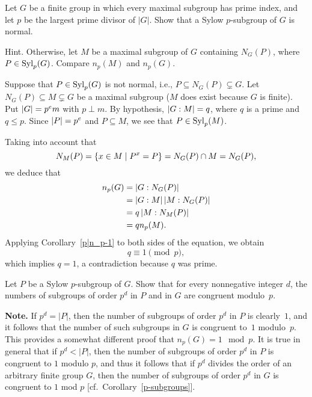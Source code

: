 \begin{probl}\label{problem-1.C.7}
    Let $G$ be a finite group in which every maximal subgroup has prime index, and let $p$ be the largest prime divisor of\/ $|G|$. Show that a Sylow $p$-subgroup of\/ $G$ is normal.

    \textrm{\rm Hint. Otherwise, let $M$ be a maximal subgroup of $G$ containing $N_G(P)$, where $P\in{\rm Syl}_p(G)$. Compare $n_{p}(M)$ and $n_p(G)$.}
\end{probl}

\begin{solution} Suppose that $P\in{\rm Syl}_p(G)$ is not normal, i.e., $P\subseteq N_G(P)\varsubsetneq G$. Let $N_G(P)\subseteq M\varsubsetneq G$ be a maximal subgroup ($M$ does exist because $G$ is finite). Put $\left\vert{G}\right\vert=p^em$ with $p\perp m$. By hypothesis, $\left\vert{G:M}\right\vert=q$, where $q$ is a prime and $q\le p$. Since $\left\vert{P}\right\vert=p^e$ and $P\subseteq M$, we see that $P\in{\rm Syl}_p(M)$. %


Taking into account that
$$
    N_M(P)=\{x\in M\mid P^x=P\} = N_G(P)\cap M= N_G(P),
$$
we deduce that %
\begin{align*}
    n_p(G) &= |G:N_G(P)|\\
        &= \left\vert{G:M}\right\vert|M:N_G(P)|\\
        &= q\left\vert{M:N_M(P)}\right\vert\\
        &= qn_p(M).
\end{align*}
Applying Corollary~\ref{p|n_p-1} to both sides of the equation, we obtain
$$
    q\equiv1\pmod p,
$$
which implies $q=1$, a contradiction because $q$ was prime.  \end{solution}

\begin{probl}\label{problem-1.C.8}
    Let\/ $P$ be a Sylow\/ $p$-subgroup of\/ $G$. Show that for every nonnegative integer\/ $d$, the numbers of subgroups of order\/ $p^d$ in\/ $P$ and in\/ $G$ are congruent modulo\/~$p$.

    \textrm{\rm {\bf Note.} If $p^d = |P|$, then the number of subgroups of order $p^d$ in $P$ is clearly~$1$, and it follows that the number of such subgroups in $G$ is congruent to~$1$ modulo~$p$. This provides a somewhat different proof that $n_p(G) = 1 \mod p$. It is true in general that if $p^d < |P|$, then the number of subgroups of order $p^d$ in $P$ is congruent to $1$ modulo $p$, and thus it follows that if $p^d$ divides the order of an arbitrary finite group $G$, then the number of subgroups of order $p^d$ in $G$ is congruent to $1$ mod $p$ [cf.~Corollary~\ref{p-subgroups}].}
\end{probl}

